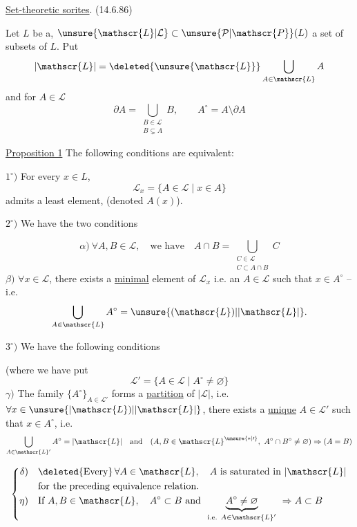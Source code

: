 \uline{Set-theoretic sorites}. \quad (14.6.86)

Let $L$ be a, $\unsure{\mathscr{L}|\mathcal{L}}\subset\unsure{\mathcal{P}|\mathscr{P}}(L)$ a set of subsets of $L$. Put
\[
|\mathscr{L}|=\deleted{\unsure{\mathscr{L}}}\bigcup_{A\in\mathscr{L}}A
\]
and for $A\in\mathscr{L}$
\[
\partial A=\bigcup_{\substack{B\in\mathscr{L}\\B\subsetneq A}}B,\qquad A^\circ=A\setminus\partial A
\]

\uline{Proposition 1} The following conditions are equivalent:

$1^\circ)$ For every $x\in L$,  
\[
\mathscr{L}_x=\{A\in\mathscr{L}\mid x\in A\}
\]
admits a least element, (denoted $A(x)$).

$2^\circ)$ We have the two conditions

\[
\alpha)\ \forall A,B\in\mathscr{L},\quad\text{we have}\quad
 A\cap B=\bigcup_{\substack{C\in\mathscr{L}\\C\subset A\cap B}}C
\]
$\beta)$ $\forall x\in\mathscr{L}$, there exists a \uline{minimal} element of $\mathscr{L}_x$ i.e. an $A\in\mathscr{L}$ such that $x\in A^\circ$ -- i.e.
\[
\bigcup_{A\in\mathscr{L}}A^\circ=\unsure{(\mathscr{L})|\lvert\mathscr{L}\rvert}.
\]

$3^\circ)$ We have the following  conditions

(where  we have put
\[
\mathscr{L}'=\{A\in\mathscr{L}\mid A^\circ\ne\varnothing\}
\]
$\gamma)$ The family $\{A^\circ\}_{A\in\mathscr{L}'}$ forms a \uline{partition} of $|\mathscr{L}|$, i.e. $\forall x\in\unsure{\lvert\mathscr{L})|\lvert\mathscr{L}\rvert}$, \deleted{\unsure{\ensuremath{\exists!}}} there exists a \uline{unique} $A\in\mathscr{L}'$ such that $x\in A^\circ$, i.e.
\[
\bigcup_{A\in\mathscr{L}'} A^\circ=|\mathscr{L}|\quad\text{and}\quad
(A,B\in\mathscr{L}^{\unsure{*|\prime}},\ A^\circ\cap B^\circ\ne\varnothing)\Rightarrow(A=B)
\]

\[
\left\{\begin{aligned}
\delta)&\quad \deleted{\text{Every}}\,\forall A\in\mathscr{L},\quad A\ \text{is saturated in }|\mathscr{L}|\\
 &\quad\text{for the preceding equivalence relation.}\\
\eta)&\quad\text{If } A,B\in\mathscr{L},\quad A^\circ\subset B\ \text{and }\
 \underset{\text{i.e. } A\in\mathscr{L}'}{\underbrace{A^\circ\ne\varnothing}}\ \Rightarrow A\subset B
\end{aligned}\right.
\]
